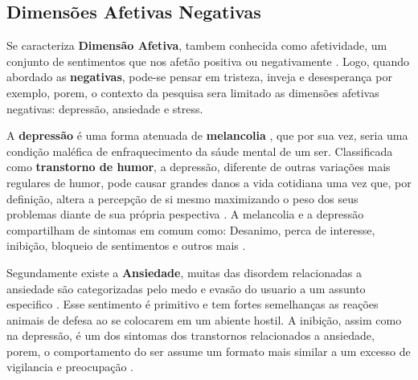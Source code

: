 \subsection{Dimensões Afetivas Negativas}
Se caracteriza \textbf{Dimensão Afetiva}, tambem conhecida como afetividade, um conjunto de sentimentos que nos afetão positiva ou negativamente \cite{pinto2009afetos}. Logo, quando abordado as \textbf{negativas}, pode-se pensar em tristeza, inveja e desesperança por exemplo, porem, o contexto da pesquisa sera limitado as dimensões afetivas negativas: depressão, ansiedade e stress.

A \textbf{depressão} é uma forma atenuada de \textbf{melancolia} \cite{roudinesco2000psicanalise}, que por sua vez, seria uma condição maléfica de enfraquecimento da sáude mental de um ser. Classificada como \textbf{transtorno de humor}, a depressão, diferente de outras variações mais regulares de humor, pode causar grandes danos a vida cotidiana uma vez que, por definição, altera a percepção de si mesmo maximizando o peso dos seus problemas diante de sua própria pespectiva \cite{esteves2006depressao}. A melancolia e a depressão compartilham de sintomas em comum como: Desanimo, perca de interesse, inibição, bloqueio de sentimentos e outros mais \cite[28]{freud2014livro}.

Segundamente existe a \textbf{Ansiedade}, muitas das disordem relacionadas a ansiedade são categorizadas pelo medo e evasão do usuario a um assunto especifico \cite[393]{dsmiv}. Esse sentimento é primitivo e tem fortes semelhanças as reações animais de defesa ao se colocarem em um abiente hostil. A inibição, assim como na depressão, é um dos sintomas dos transtornos relacionados a ansiedade, porem, o comportamento do ser assume um formato mais similar a um excesso de vigilancia e preocupação \cite{margis2003relaccao}.
